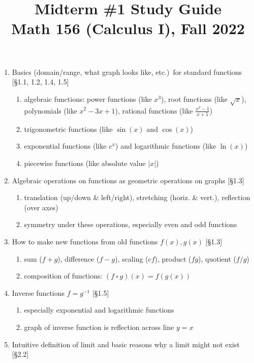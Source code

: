 \documentclass[11pt]{article}
\title{Midterm \#1 Study Guide \\ Math 156 (Calculus I), Fall 2022}
\date{}
\begin{document}
\maketitle

\thispagestyle{empty}

\vspace{-1.5cm}

\begin{enumerate}
\item Basics (domain/range, what graph looks like, etc.)~for standard functions [\S1.1, 1.2, 1.4, 1.5]
\begin{enumerate}
\item algebraic functions: power functions (like $x^3$), root functions (like $\sqrt{x}$), \\ polynomials (like $x^2-3x+1$), rational functions (like $\frac{x^2-1}{x+5}$)
\item trigonometric functions (like $\sin(x)$ and $\cos(x)$)
\item exponential functions (like $e^x$) and logarithmic functions (like $\ln(x)$)
\item piecewise functions (like absolute value $|x|$)
\end{enumerate}
\item Algebraic operations on functions as geometric operations on graphs [\S1.3]
\begin{enumerate}
\item translation (up/down $\&$ left/right), stretching (horiz. $\&$ vert.), reflection (over axes)
\item symmetry under these operations, especially even and odd functions
\end{enumerate}
\item How to make new functions from old functions $f(x), g(x)$ [\S1.3]
\begin{enumerate}
\item sum ($f+g$), difference ($f-g$), scaling ($cf$), product ($fg$), quotient ($f/g$)
\item composition of functions: $(f \circ g)(x) = f(g(x))$
\end{enumerate}
\item Inverse functions $f=g^{-1}$ [\S1.5]
\begin{enumerate}
\item especially exponential and logarithmic functions
\item graph of inverse function is reflection across line $y=x$
\end{enumerate}
\item Intuitive definition of limit and basic reasons why a limit might not exist [\S2.2]

\end{enumerate}
\end{document}
